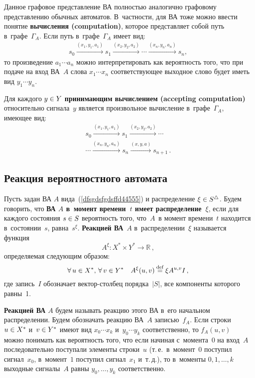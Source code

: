 \begin{multicols}{2}
Данное графовое представление ВА полностью аналогично графовому
представлению обычных автоматов.
В~частности, для ВА тоже можно ввести понятие
\textbf{вы\-чис\-ле\-ния (computation)}, которое пред\-став\-ля\-ет
собой путь в~графе~$\Gamma_A$.
Если путь в~графе~$\Gamma_A$ имеет вид:
\begin{multline*}
s_0\xrightarrow{(x_1,y_1,a_1)}s_1\xrightarrow{(x_2,y_2,a_2)}\cdots
\xrightarrow{(x_n,y_n,a_n)}s_n,
\end{multline*}
то произведение $a_1\cdots a_n$ можно интерпретировать
как вероятность того, что при подаче
на вход ВА~$A$ слова $x_1\cdots x_n$
соответствующее выходное слово будет иметь вид $y_1\cdots y_n$.


Для каждого $y\hm\in Y$
\textbf{принимающим вы\-чис\-ле\-ни\-ем (accepting computation)} относительно сигнала~$y$
является произвольное вы\-чис\-ле\-ние в~графе~$\Gamma_A$,
име\-ющее вид:
\begin{multline*}
s_0\xrightarrow{(x_1,y_1,a_1)}s_1\xrightarrow{(x_2,y_2,a_2)}\cdots\\
\cdots
\xrightarrow{(x_n,y_n,a_n)} s_n \xrightarrow{(x,y,a)} s_{n+1}\,.
\end{multline*}

\subsection{Реакция вероятностного автомата}

Пусть задан ВА $A$ вида~(\ref{dfsgdsfgdsffd44555})
и распределение $\xi\hm\in S^\bullettri$.
Будем говорить, что  \textbf{ВА $A$  в~момент времени~$t$
 имеет распределение~$\xi$},
 если  для каждого состояния $s\hm\in S$ вероятность того,
 что~$A$~в момент времени~$t$ находится в~состоянии~$s$,
 равна~$s^\xi$.
\textbf{Реакцией ВА}~$A$ в~распределении~$\xi$ называется функция
$$
A^\xi: X^*\times Y^*\to\mathbb{R}\,,
$$
определяемая следующим образом:
$$
\forall\,u\in X^*, \,\forall\,v \in Y^*\quad
A^\xi(u,v)\mathbin{{\mathop{=}\limits^{\mathrm{def}}}} \xi A^{u,v} I\,,
$$
где запись~$I$ обозначает
век\-тор-стол\-бец порядка~$|S|$, все компоненты которого равны~1.

\textbf{Реакцией ВА $A$}  будем называть реакцию этого
ВА в~его начальном распределении. Будем обозначать
реакцию ВА~$A$ записью~$f_A$.
Если строки $u\hm\in X^*$ и~$v\hm\in Y^*$
имеют вид
$x_0\cdots x_k$ и~$y_0\cdots y_k$
соответственно, то  $f_A(u,v)$
можно понимать как    вероятность того, что если начиная с~момента~0
      на вход~$A$ последовательно    поступали элементы строки~$u$
   (т.\,е.\ в~момент~$0$ поступил сигнал~$x_0$,
   в~момент~$1$ поступил сигнал~$x_1$
   и~т.\,д.), то в~моменты $0,1,\ldots, k$
   выходные сигналы~$A$ равны $y_0,\ldots, y_k$ соответственно.


\end{multicols}
